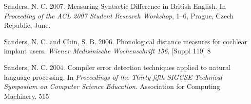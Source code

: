 \documentclass{iuthesis}
\begin{document}
 Sanders, N. C. 2007. Measuring Syntactic Difference in British
  English. In \emph{Proceeding of the ACL 2007 Student Research
    Workshop}, 1--6, Prague, Czech Republic, June.

  Sanders, N. C. and Chin, S. B. 2006. Phonological distance measures for cochlear implant users. \emph{Wiener Medizinische Wochenschrift 156}, [Suppl 119] 8

 Sanders, N. C.  2004. Compiler error detection techniques applied to natural language processing. In \emph{Proceedings of the Thirty-fifth SIGCSE Technical Symposium on Computer Science Education}. Association for Computing Machinery, 515



\end{document}
